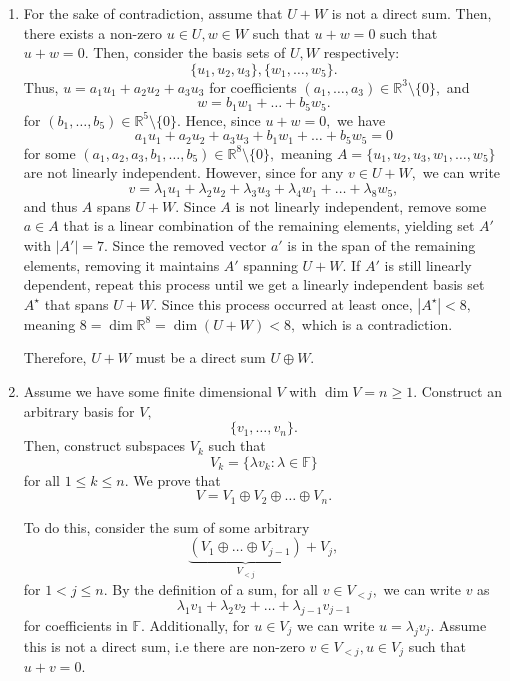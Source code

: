 \documentclass[12pt]{article}
\begin{document}
\begin{enumerate}
  \item For the sake of contradiction, assume that $U + W$ is not a
    direct sum. Then, there exists a non-zero $u \in U, w \in W$ such
    that $u + w = 0$ such that $u + w = 0.$ Then, consider the basis
    sets of $U, W$ respectively:
    $$
    \{u_1, u_2, u_3\}, \{w_1, \ldots, w_5\}.
    $$
    Thus, $u = a_1 u_1 + a_2 u_2 + a_3 u_3$ for coefficients $(a_1,
    \ldots, a_3) \in \mathbb R^3 \setminus \{0\},$ and
    $$
    w = b_1 w_1 + \ldots + b_5 w_5.
    $$ for $(b_1, \ldots, b_5) \in \mathbb R^{5} \setminus \{0\}.$
    Hence, since $u + w  = 0,$ we have
    $$
    a_1 u_1 + a_2 u_2 + a_3 u_3 + b_1 w_1 + \ldots + b_5 w_5 = 0
    $$
    for some $(a_1, a_2, a_3, b_1, \ldots, b_5) \in \mathbb R^{8}
    \setminus \{0\},$ meaning $A = \{u_1, u_2, u_3, w_1, \ldots,
    w_5\}$ are not linearly independent. However, since for any $v
    \in U + W,$ we can write
    $$
    v = \lambda_1 u_1 + \lambda_2 u_2 + \lambda_3 u_3 + \lambda_4 w_1
    + \ldots + \lambda_8 w_5,
    $$
    and thus $A$ spans $U + W.$ Since $A$ is not linearly
    independent, remove some $a \in A$ that is a linear combination
    of the remaining elements, yielding set $A'$ with $|A'| = 7.$
    Since the removed vector $a'$ is in the span of the remaining
    elements, removing it maintains $A'$ spanning $U + W.$ If $A'$ is
    still linearly dependent, repeat this process until we get a
    linearly independent basis set $A^\star$ that spans $U + W.$
    Since this process occurred at least once, $|A^\star| < 8,$
    meaning $8 = \dim \mathbb R^8 = \dim (U + W) < 8,$ which is a contradiction.

    Therefore, $U + W$ must be a direct sum $U \oplus W.$

  \item Assume we have some finite dimensional $V$ with $\dim V = n
    \geq 1.$ Construct an arbitrary basis for $V,$
    $$
    \{v_1, \ldots, v_n\}.
    $$
    Then, construct subspaces $V_k$ such that
    $$
    V_k = \{\lambda v_k : \lambda \in \mathbb F\}
    $$
    for all $1 \leq k \leq n.$ We prove that $$
    V = V_1 \oplus V_2 \oplus \ldots \oplus  V_n.
    $$

    To do this, consider the sum of some arbitrary
    $$
    \underbrace{(V_1 \oplus \ldots \oplus V_{j - 1})}_{V_{<j}} + V_{j},
    $$
    for $1 < j \leq n.$ By the definition of a sum, for all $v \in
    V_{< j},$  we can write $v$ as
    $$
    \lambda_1 v_1  + \lambda_2 v_2 + \ldots + \lambda_{j -1 } v_{j -1}
    $$
    for coefficients in $\mathbb F.$ Additionally, for $u \in V_j$ we can write
    $u = \lambda_j v_j.$ Assume this is not a direct sum, i.e there
    are non-zero $v \in V_{<j}, u \in V_j$ such that
    $u + v = 0.$


\end{enumerate}
\end{document}
